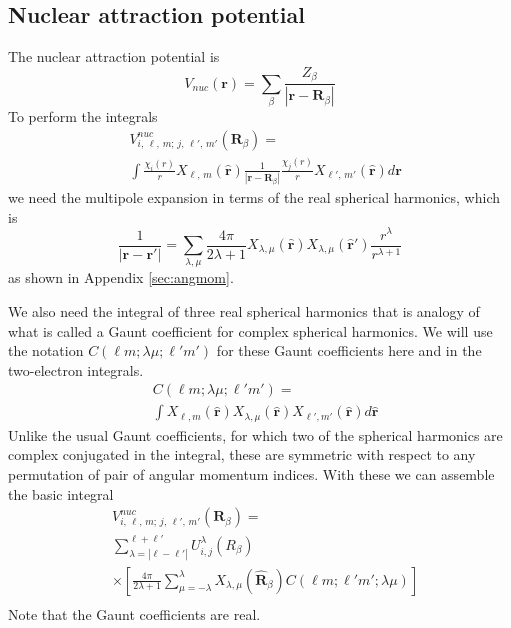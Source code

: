 \documentclass[%
pra%
,twocolumn%
,amssymb, nobibnotes, aps,
longbibliography
]{revtex4-1}
\begin{document}
\subsection{Nuclear attraction potential}
The nuclear attraction potential is
\begin{equation}
V_{nuc}(\mathbf{r}) = \sum_\beta \frac{Z_\beta}{|\mathbf{r}-\mathbf{R}_\beta|}
\end{equation}
To perform the integrals 
\begin{equation}
\begin{split}
& V^{nuc}_{i, \, \ell, \,m; \, j, \,\ell', \, m'}(\mathbf{R}_\beta) = \\
&\int \frac{\chi_{i}(r)}{r}X_{\ell, \,m} (\mathbf{\hat{r}})
\frac{1}{|\mathbf{r}-\mathbf{R}_\beta|}
\frac{\chi_j(r)}{r} X_{\ell', \, m'} (\mathbf{\hat{r}})
d\mathbf{r}
\end{split}
\end{equation}
we need the multipole expansion in terms of the real spherical harmonics, which is
\begin{equation}
\frac{1}{| \mathbf{r}- \mathbf{r}'|} = 
 \sum_{\lambda,\mu} \frac{4 \pi}{2\lambda +1}
X_{\lambda,\mu}(\mathbf{\hat{r}})
X_{\lambda,\mu}(\mathbf{\hat{r}}')
\frac{r^\lambda}{r^{\lambda+1}}
\end{equation}
as shown in Appendix \ref{sec:angmom}.

We also need the integral of three real spherical harmonics
that is analogy of what is called a Gaunt coefficient for complex
spherical harmonics.  We will use the notation
$C(\ell m;\lambda \mu;\ell' m')$ for these  Gaunt coefficients 
here and in the two-electron integrals.
\begin{equation}
\begin{split}
& C(\ell m;\lambda \mu;\ell' m')= \\
& \int 
X_{\ell,m} (\mathbf{\hat{r}})
X_{\lambda,\mu} (\mathbf{\hat{r}})
X_{\ell',m'} (\mathbf{\hat{r}})
d\mathbf{\hat{r}} 
\end{split}
\end{equation}
Unlike the usual Gaunt coefficients, for which two of the spherical
harmonics are complex conjugated in the integral, these are symmetric
with respect to any permutation of pair of angular momentum indices.
With these we can assemble the basic integral
\begin{equation}
\boxed{
\begin{aligned}
& V^{nuc}_{i, \, \ell, \,m; \, j, \,\ell', \, m'}(\mathbf{R}_\beta) = \\
& \sum_{\lambda=|\ell-\ell'|}^{\ell+\ell'}
  U^\lambda_{i,j}(R_\beta) \\
& \times \left[
 \frac{4\pi} {2\lambda+1} 
\sum_{\mu=-\lambda}^{\lambda} X_{\lambda,\mu}(\mathbf{\hat{R}}_\beta)
C(\ell m;\ell' m';\lambda \mu)   \right] \\
\end{aligned}
}
\end{equation}
Note that the Gaunt coefficients are real.
\end{document}
